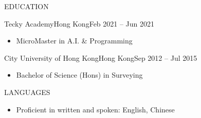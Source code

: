 \documentclass[]{resume}
\begin{document}
	\begin{cvsection}{EDUCATION}
		\begin{cvsubsection}{Tecky Academy}{Hong Kong}{Feb 2021 -- Jun 2021}
			\begin{itemize}
				\item MicroMaster in A.I. \& Programming
			\end{itemize}
		\end{cvsubsection}
		
		\begin{cvsubsection}{City University of Hong Kong}{Hong Kong}{Sep 2012 -- Jul 2015}
			\begin{itemize}
				\item Bachelor of Science (Hons) in Surveying
			\end{itemize}
		\end{cvsubsection}
	\end{cvsection}
	
	\begin{cvsection}{LANGUAGES}
		\begin{cvsubsection}{}{}{}	
			\begin{itemize}
				\item Proficient in written and spoken: English, Chinese 
			\end{itemize}
		\end{cvsubsection}
	\end{cvsection}
	
\end{document}

